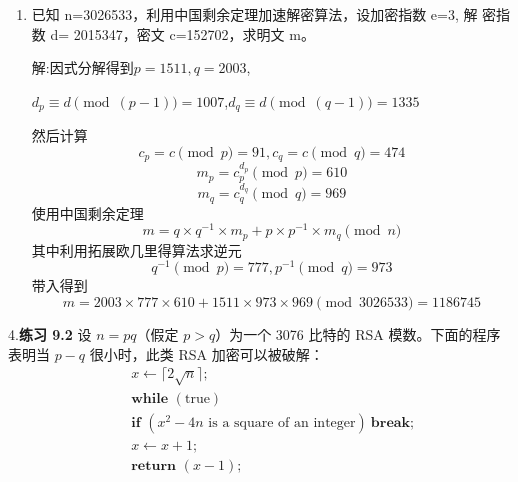 \documentclass[12pt,a4paper]{article}
\begin{document}
\begin{enumerate}
所以
\(m^{ed} \equiv m \pmod n\)

因此算法正确

\item 已知 n=3026533，利用中国剩余定理加速解密算法，设加密指数 e=3, 解
密指数 d= 2015347，密文 c=152702，求明文 m。

解:因式分解得到\(p=1511,q=2003\),

\(d_p \equiv d \pmod{(p-1)} = 1007\),\(d_q \equiv d \pmod{(q-1)} =1335\)

然后计算
\[
c_p = c \pmod p = 91,c_q = c \pmod q = 474
\]
\[
m_p = c_p^{d_p} \pmod p = 610
\]
\[
m_q = c_q^{d_q} \pmod q = 969
\]
使用中国剩余定理
\[
m = q\times q^{-1} \times m_p + p \times p^{-1} \times m_q \pmod n
\]
其中利用拓展欧几里得算法求逆元
\[
q^{-1} \pmod p = 777,p^{-1} \pmod q = 973
\]
带入得到
\[
m = 2003 \times 777 \times 610 + 1511 \times 973 \times 969 \pmod{3026533} = 1186745
\]
\end{enumerate}
4.\textbf{练习 9.2} \quad 设 $n = pq$（假定 $p > q$）为一个 3076 比特的 RSA 模数。下面的程序表明当 $p - q$ 很小时，此类 RSA 加密可以被破解：
\begin{align*}
&x \leftarrow \lceil 2\sqrt{n} \rceil; \\
&\textbf{while } (\text{true}) \\
\quad &\textbf{if } (x^2 - 4n \text{ is a square of an integer})\ \textbf{break;} \\
\quad &x \leftarrow x + 1; \\
&\textbf{return } (x - 1);
\end{align*}
\end{document}
